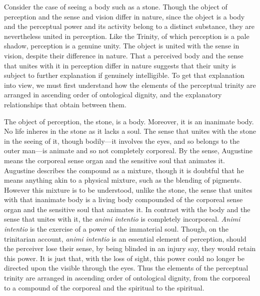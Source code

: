 \documentclass[12pt]{article}
\begin{document}
Consider the case of seeing a body such as a stone. Though the object of perception and the sense and vision differ in nature, since the object is a body and the perceptual power and its activity belong to a distinct substance, they are nevertheless united in perception. Like the Trinity, of which perception is a pale shadow, perception is a genuine unity. The object is united with the sense in vision, despite their difference in nature. That a perceived body and the sense that unites with it in perception differ in nature suggests that their unity is subject to further explanation if genuinely intelligible. To get that explanation into view, we must first understand how the elements of the perceptual trinity are arranged in ascending order of ontological dignity, and the explanatory relationships that obtain between them.

The object of perception, the stone, is a body. Moreover, it is an inanimate body. No life inheres in the stone as it lacks a soul. The sense that unites with the stone in the seeing of it, though bodily---it involves the eyes, and so belongs to the outer man---is animate and so not completely corporeal. By the sense, Augustine means the corporeal sense organ and the sensitive soul that animates it. Augustine describes the compound as a mixture, though it is doubtful that he means anything akin to a physical mixture, such as the blending of pigments. However this mixture is to be understood, unlike the stone, the sense that unites with that inanimate body is a living body compounded of the corporeal sense organ and the sensitive soul that animates it. In contrast with the body and the sense that unites with it, the \emph{animi intentio} is completely incorporeal. \emph{Animi intentio} is the exercise of a power of the immaterial soul. Though, on the trinitarian account, \emph{animi intentio} is an essential element of perception, should the perceiver lose their sense, by being blinded in an injury say, they would retain this power. It is just that, with the loss of sight, this power could no longer be directed upon the visible through the eyes. Thus the elements of the perceptual trinity are arranged in ascending order of ontological dignity, from the corporeal to a compound of the corporeal and the spiritual to the spiritual.
\end{document}
